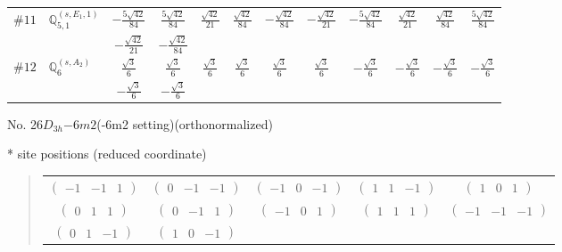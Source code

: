 \documentclass[fleqn,9pt,landscape]{jsarticle}
\begin{document}
\begin{center}
\begin{longtable}{lcccccccccc}
$ \#11\quad \mathbb{Q}_{5,1}^{(s,E_{1},1)} $ & $ - \frac{5 \sqrt{42}}{84} $ & $ \frac{5 \sqrt{42}}{84} $ & $ \frac{\sqrt{42}}{21} $ & $ \frac{\sqrt{42}}{84} $ & $ - \frac{\sqrt{42}}{84} $ & $ - \frac{\sqrt{42}}{21} $ & $ - \frac{5 \sqrt{42}}{84} $ & $ \frac{\sqrt{42}}{21} $ & $ \frac{\sqrt{42}}{84} $ & $ \frac{5 \sqrt{42}}{84} $ \\
& $ - \frac{\sqrt{42}}{21} $ & $ - \frac{\sqrt{42}}{84} $ & $  $ & $  $ & $  $ & $  $ & $  $ & $  $ & $  $ & $  $ \\ \hline
$ \#12\quad \mathbb{Q}_{6}^{(s,A_{2})} $ & $ \frac{\sqrt{3}}{6} $ & $ \frac{\sqrt{3}}{6} $ & $ \frac{\sqrt{3}}{6} $ & $ \frac{\sqrt{3}}{6} $ & $ \frac{\sqrt{3}}{6} $ & $ \frac{\sqrt{3}}{6} $ & $ - \frac{\sqrt{3}}{6} $ & $ - \frac{\sqrt{3}}{6} $ & $ - \frac{\sqrt{3}}{6} $ & $ - \frac{\sqrt{3}}{6} $ \\
& $ - \frac{\sqrt{3}}{6} $ & $ - \frac{\sqrt{3}}{6} $ & $  $ & $  $ & $  $ & $  $ & $  $ & $  $ & $  $ & $  $ \\
\end{longtable}
\end{center}
\newpage
\begin{center}
\LARGE
No. 26\quad$D_{3h}$\quad$-6m2$\quad(-6m2 setting)\quad[ hexagonal ] (orthonormalized)
\end{center}
\vspace{5mm}
* site positions (reduced coordinate)
\begin{quote}
\begin{tabular}{ccccc}
$ \begin{pmatrix} -1 & -1 & 1 \end{pmatrix} $ & $ \begin{pmatrix} 0 & -1 & -1 \end{pmatrix} $ & $ \begin{pmatrix} -1 & 0 & -1 \end{pmatrix} $ & $ \begin{pmatrix} 1 & 1 & -1 \end{pmatrix} $ & $ \begin{pmatrix} 1 & 0 & 1 \end{pmatrix} $ \\
$ \begin{pmatrix} 0 & 1 & 1 \end{pmatrix} $ & $ \begin{pmatrix} 0 & -1 & 1 \end{pmatrix} $ & $ \begin{pmatrix} -1 & 0 & 1 \end{pmatrix} $ & $ \begin{pmatrix} 1 & 1 & 1 \end{pmatrix} $ & $ \begin{pmatrix} -1 & -1 & -1 \end{pmatrix} $ \\
$ \begin{pmatrix} 0 & 1 & -1 \end{pmatrix} $ & $ \begin{pmatrix} 1 & 0 & -1 \end{pmatrix} $ & $  $ & $  $ & $  $
\end{tabular}
\end{quote}
\end{document}
